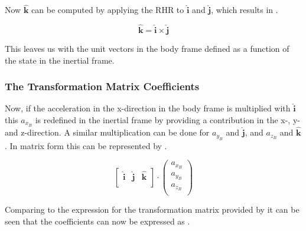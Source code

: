 \noindent
Now $\mathbf{\hat{k}}$ can be computed by applying the \ac{RHR} to $\mathbf{\hat{i}}$ and $\mathbf{\hat{j}}$, which results in .

\begin{equation} \label{eq:kHat}
\mathbf{\hat{k}} = \mathbf{\hat{i}} \times \mathbf{\hat{j}}
\end{equation}

\noindent
This leaves us with the unit vectors in the body frame defined as a function of the state in the inertial frame. 

\subsubsection{The Transformation Matrix Coefficients}
\label{subsubsec:filTransMat}
Now, if the acceleration in the x-direction in the body frame is multiplied with $\mathbf{\hat{i}}$ this $a_{x_{B}}$ is redefined in the inertial frame by providing a contribution in the x-, y- and z-direction. A similar multiplication can be done for $a_{y_{B}}$ and $\mathbf{\hat{j}}$, and $a_{z_{B}}$ and $\mathbf{\hat{k}}$. In matrix form this can be represented by .

\begin{equation} \label{eq:firstFillEx}
\left[
\begin{matrix}
\mathbf{\hat{i}} &
\mathbf{\hat{j}} &
\mathbf{\hat{k}} \\
\end{matrix}
\right]
\cdot
\begin{pmatrix}
a_{x_{B}} \\
a_{y_{B}} \\
a_{z_{B}} \\
\end{pmatrix}
\end{equation}

\noindent
Comparing  to the expression for the transformation matrix provided by  it can be seen that the coefficients can now be expressed as .

